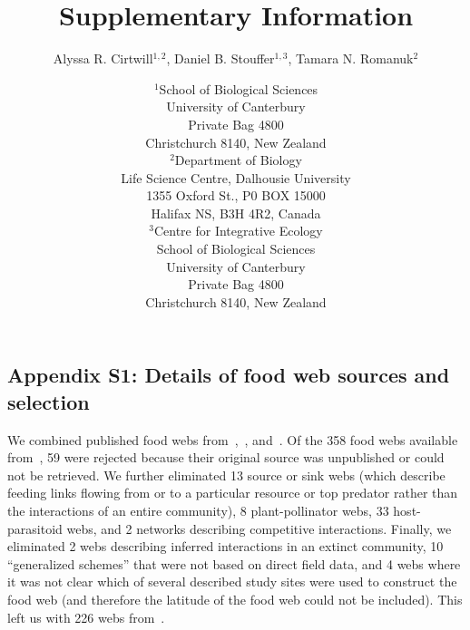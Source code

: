 \documentclass[12pt]{article}
\newcommand{\beginsupplement}{%
        \setcounter{table}{0}
        \renewcommand{\thetable}{S\arabic{table}}%
        \setcounter{figure}{0}
        \renewcommand{\thefigure}{S\arabic{figure}}%
     }
\begin{document}
\title{Supplementary Information}
\author{Alyssa R. Cirtwill$^{1,2}$, Daniel B. Stouffer$^{1,3}$, Tamara N. Romanuk$^{2}$}
\date{\footnotesize$^1$School of Biological Sciences\\University of Canterbury\\
Private Bag 4800\\Christchurch 8140, New Zealand \\
\medskip$^2$Department of Biology\\
Life Science Centre, Dalhousie University\\1355 Oxford St., P0 BOX 15000\\
Halifax NS, B3H 4R2, Canada\\
\medskip$^3$Centre for Integrative Ecology\\School of Biological Sciences\\University of Canterbury\\
Private Bag 4800\\Christchurch 8140, New Zealand \\}



\maketitle
\baselineskip=8.5mm

\vspace{0.4 in}
\beginsupplement
\linenumbers
\subsection*{Appendix S1: Details of food web sources and selection}

  We combined published food webs from~\citet{GlobalWeb},~\citet{Riede2011},
  and~\citet{Dunne2013}. Of the 358 food webs available
  from~\citet{GlobalWeb}, 59 were rejected because their original source was
  unpublished or could not be retrieved. We further eliminated 13 source or
  sink webs (which describe feeding links flowing from or to a particular
  resource or top predator rather than the interactions of an entire
  community), 8 plant-pollinator webs, 33 host-parasitoid webs, and 2 networks
  describing competitive interactions. Finally, we eliminated 2 webs
  describing  inferred interactions in an extinct community, 10 ``generalized
  schemes'' that were not based on direct field data, and 4 webs where it was
  not clear which of several described study sites were used to construct the
  food web (and therefore the latitude of the food web could not be
  included). This left us with 226 webs from~\citet{GlobalWeb}.
\end{document}
